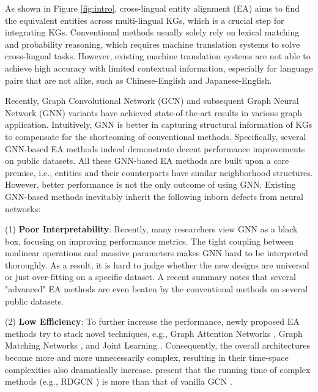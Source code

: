 \documentclass[11pt]{article}
\begin{document}
As shown in Figure \ref{fig:intro}, cross-lingual entity alignment (EA) aims to find the equivalent entities across multi-lingual KGs, which is a crucial step for integrating KGs.
Conventional methods \cite{DBLP:journals/pvldb/SuchanekAS11,DBLP:conf/semweb/Jimenez-RuizG11} usually solely rely on lexical matching and probability reasoning, which requires machine translation systems to solve cross-lingual tasks.
However, existing machine translation systems are not able to achieve high accuracy with limited contextual information, especially for language pairs that are not alike, such as Chinese-English and Japanese-English.

Recently, Graph Convolutional Network (GCN) \cite{DBLP:conf/iclr/KipfW17} and subsequent Graph Neural Network (GNN) variants have achieved state-of-the-art results in various graph application.
Intuitively, GNN is better in capturing structural information of KGs to compensate for the shortcoming of conventional methods.
Specifically, several GNN-based EA methods \cite{DBLP:conf/acl/XuWYFSWY19,DBLP:conf/ijcai/WuLF0Y019,DBLP:conf/emnlp/WangYY20} indeed demonstrate decent performance improvements on public datasets.
All these GNN-based EA methods are built upon a core premise, i.e., entities and their counterparts have similar neighborhood structures.
However, better performance is not the only outcome of using GNN.
Existing GNN-based methods inevitably inherit the following inborn defects from neural networks:

(1) \textbf{Poor Interpretability}:
Recently, many researchers view GNN \cite{DBLP:conf/acl/XuWYFSWY19,DBLP:conf/ijcai/WuLF0Y019} as a black box, focusing on improving performance metrics.
The tight coupling between nonlinear operations and massive parameters makes GNN hard to be interpreted thoroughly.
As a result, it is hard to judge whether the new designs are universal or just over-fitting on a specific dataset.
A recent summary \cite{DBLP:conf/coling/ZhangLCCLXZ20} notes that several "advanced" EA methods are even beaten by the conventional methods on several public datasets.

(2) \textbf{Low Efficiency}:
To further increase the performance, newly proposed EA methods try to stack novel techniques, e.g., Graph Attention Networks \cite{DBLP:conf/ijcai/WuLF0Y019}, Graph Matching Networks \cite{DBLP:conf/acl/XuWYFSWY19}, and Joint Learning \cite{DBLP:conf/acl/CaoLLLLC19}.
Consequently, the overall architectures become more and more unnecessarily complex, resulting in their time-space complexities also dramatically increase.
\citet{9174835} present that the running time of complex methods (e.g., RDGCN \cite{DBLP:conf/ijcai/WuLF0Y019}) is  more than that of vanilla GCN \cite{DBLP:conf/emnlp/WangLLZ18}.
\end{document}
